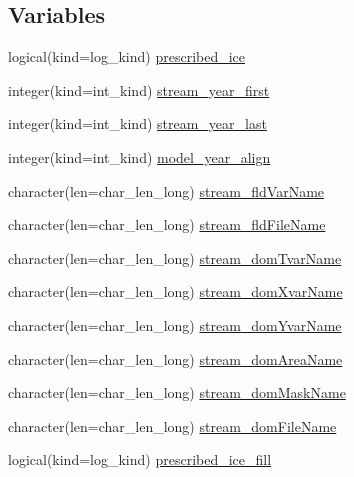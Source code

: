 \subsection*{Variables}
\begin{DoxyCompactItemize}
\item 
logical(kind=log\_\-kind) \hyperlink{namespaceice__prescribed__mod_a1b42a8c2b0357eb657332946d2b6c78a}{prescribed\_\-ice}
\item 
integer(kind=int\_\-kind) \hyperlink{namespaceice__prescribed__mod_a8ffe8edc2e99d865aa09b7c7f7801c37}{stream\_\-year\_\-first}
\item 
integer(kind=int\_\-kind) \hyperlink{namespaceice__prescribed__mod_ade5d68f1b7b652dcacb5263e02aaa099}{stream\_\-year\_\-last}
\item 
integer(kind=int\_\-kind) \hyperlink{namespaceice__prescribed__mod_a1710ba150bcf274f07add3f2a05b49e7}{model\_\-year\_\-align}
\item 
character(len=char\_\-len\_\-long) \hyperlink{namespaceice__prescribed__mod_a345c4a3ce0fa3d2ebe4468d03a9fe51a}{stream\_\-fldVarName}
\item 
character(len=char\_\-len\_\-long) \hyperlink{namespaceice__prescribed__mod_a6f95de7f96b71c33ef261199631ddf80}{stream\_\-fldFileName}
\item 
character(len=char\_\-len\_\-long) \hyperlink{namespaceice__prescribed__mod_abae176465bd6efc8cb114772aa63b145}{stream\_\-domTvarName}
\item 
character(len=char\_\-len\_\-long) \hyperlink{namespaceice__prescribed__mod_ae6a726ada1e1e93644fa269052a767e4}{stream\_\-domXvarName}
\item 
character(len=char\_\-len\_\-long) \hyperlink{namespaceice__prescribed__mod_a38e084e4885a0dcfa51a63fbccbe05b0}{stream\_\-domYvarName}
\item 
character(len=char\_\-len\_\-long) \hyperlink{namespaceice__prescribed__mod_a4c5e8c8c8c573e69e00039703e28a83f}{stream\_\-domAreaName}
\item 
character(len=char\_\-len\_\-long) \hyperlink{namespaceice__prescribed__mod_afe7ec341a14bd719d0759586a729e76d}{stream\_\-domMaskName}
\item 
character(len=char\_\-len\_\-long) \hyperlink{namespaceice__prescribed__mod_a54b8dea8c8a1cdca57b336d8dedeb51c}{stream\_\-domFileName}
\item 
logical(kind=log\_\-kind) \hyperlink{namespaceice__prescribed__mod_aa4a8e7410405429c0277535dff2ec7ea}{prescribed\_\-ice\_\-fill}
\item 

\end{DoxyCompactItemize}

